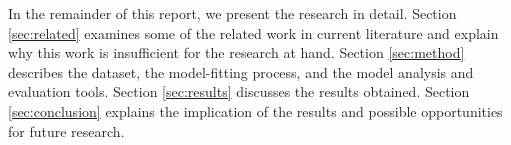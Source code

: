 \documentclass[../main.tex]{subfiles}
\begin{document}

In the remainder of this report, we present the research in detail. Section \ref{sec:related} examines some of the related work in current literature and explain why this work is insufficient for the research at hand. Section \ref{sec:method} describes the dataset, the model-fitting process, and the model analysis and evaluation tools. Section \ref{sec:results} discusses the results obtained. Section \ref{sec:conclusion} explains the implication of the results and possible opportunities for future research.
\end{document}
